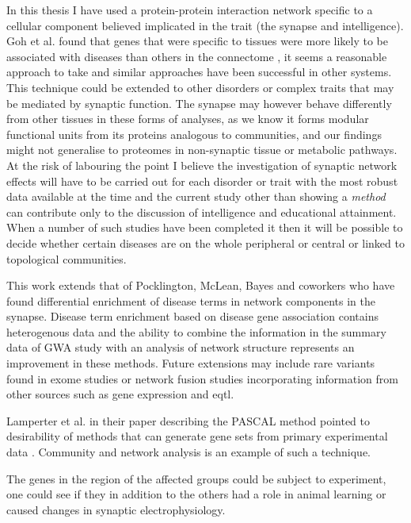 In this thesis I have used a protein-protein interaction network specific to a cellular component believed implicated in the trait (the synapse and intelligence\cite{hill2014functional}). Goh et al. found that genes that were specific to tissues were more likely to be associated with diseases than others in the connectome \cite{goh2007human}, it seems a reasonable approach to take and similar approaches have been successful in other systems\cite{lundby2014annotation}. This technique could be extended to other disorders or complex traits that may be mediated by synaptic function. The synapse may however behave differently from other tissues in these forms of analyses, as we know it forms modular functional units from its proteins analogous to communities\cite{grant2012synaptopathies}, and our findings might not generalise to proteomes in non-synaptic tissue or metabolic pathways. At the risk of labouring the point I believe the investigation of synaptic network effects will have to be carried out for each disorder or trait with the most robust data available at the time and the current study other than showing a \textit{method} can contribute only to the discussion of intelligence and educational attainment. When a number of such studies have been completed it then it will be possible to decide whether certain diseases are on the whole peripheral or central or linked to topological communities.

This work extends that of Pocklington\cite{pocklington2006organization}, McLean\cite{mclean2016improved}, Bayes\cite{bayes2011characterization} and coworkers who have found differential enrichment of disease terms in network components in the synapse. Disease term enrichment based on disease gene association contains heterogenous data and the ability to combine the information in the summary data of GWA study with an analysis of network structure represents an improvement in these methods. Future extensions may include rare variants found in exome studies or network fusion studies incorporating information from other sources such as gene expression and eqtl. 
 
 Lamperter et al. \cite{lamparter2016fast} in their paper describing the PASCAL method pointed to desirability of methods that can generate gene sets from primary experimental data \cite{lamparter2016fast}. Community and network analysis is an example of such a technique.
 
 
The genes in the region of the affected groups could be subject to experiment, one could see if they in addition to the others had a role in animal learning or caused changes in synaptic electrophysiology.
 
